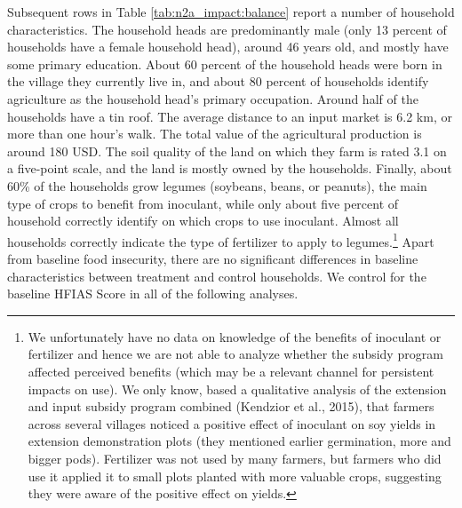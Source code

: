 Subsequent rows in Table \ref{tab:n2a_impact:balance} report a number of household characteristics. The household heads are predominantly male (only 13 percent of households have a female household head), around 46 years old, and mostly have some primary education. About 60 percent of the household heads were born in the village they currently live in, and about 80 percent of households identify agriculture as the household head’s primary occupation. Around half of the households have a tin roof. The average distance to an input market is 6.2 km, or more than one hour’s walk. The total value of the agricultural production is around 180 USD. The soil quality of the land on which they farm is rated 3.1 on a five-point scale, and the land is mostly owned by the households. Finally, about 60\% of the households grow legumes (soybeans, beans, or peanuts), the main type of crops to benefit from inoculant, while only about five percent of household correctly identify on which crops to use inoculant. Almost all households correctly indicate the type of fertilizer to apply to legumes.\footnote{We unfortunately have no data on knowledge of the benefits of inoculant or fertilizer and hence we are not able to analyze whether the subsidy program affected perceived benefits (which may be a relevant channel for persistent impacts on use). We only know, based a qualitative analysis of the extension and input subsidy program combined (Kendzior et al., 2015), that farmers across several villages noticed a positive effect of inoculant on soy yields in extension demonstration plots (they mentioned earlier germination, more and bigger pods). Fertilizer was not used by many farmers, but farmers who did use it applied it to small plots planted with more valuable crops, suggesting they were aware of the positive effect on yields.} 
Apart from baseline food insecurity, there are no significant differences in baseline characteristics between treatment and control households. We control for the baseline HFIAS Score in all of the following analyses.

